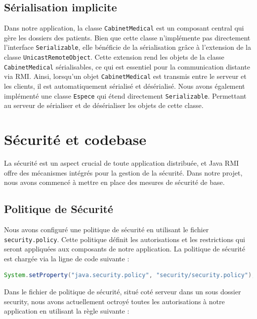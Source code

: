 \documentclass{article} %
\begin{document}
\subsection{Sérialisation implicite}

Dans notre application, la classe \texttt{CabinetMedical} est un composant central qui gère 
les dossiers des patients. Bien que cette classe n'implémente pas directement l'interface \texttt{Serializable}, 
elle bénéficie de la sérialisation grâce à l'extension de la classe \texttt{UnicastRemoteObject}. 
Cette extension rend les objets de la classe \texttt{CabinetMedical} sérialisables, 
ce qui est essentiel pour la communication distante via RMI. 
Ainsi, lorsqu'un objet \texttt{CabinetMedical} est transmis entre le serveur et les clients, 
il est automatiquement sérialisé et désérialisé.
Nous avons également implémenté une classe \texttt{Espece} qui étend directement \texttt{Serializable}. 
Permettant au serveur de sérialiser et de désérialiser les objets de cette classe. 

\newpage
\section{Sécurité et codebase}\label{sec:codebase}

La sécurité est un aspect crucial de toute application distribuée, 
et Java RMI offre des mécanismes intégrés pour la gestion de la sécurité. 
Dans notre projet, nous avons commencé à mettre en place des mesures de sécurité de base.

\subsection{Politique de Sécurité}

\begin{sloppypar}
    Nous avons configuré une politique de sécurité en utilisant le fichier \texttt{security.policy}. 
    Cette politique définit les autorisations et les restrictions qui seront appliquées aux 
    composants de notre application. La politique de sécurité est chargée via la ligne de code suivante :
\end{sloppypar}

\begin{lstlisting}[language=Java]
System.setProperty("java.security.policy", "security/security.policy");
\end{lstlisting}


Dans le fichier de politique de sécurité, situé coté serveur dans un sous dossier security, 
nous avons actuellement octroyé toutes les autorisations 
à notre application en utilisant la règle suivante :
\end{document}

